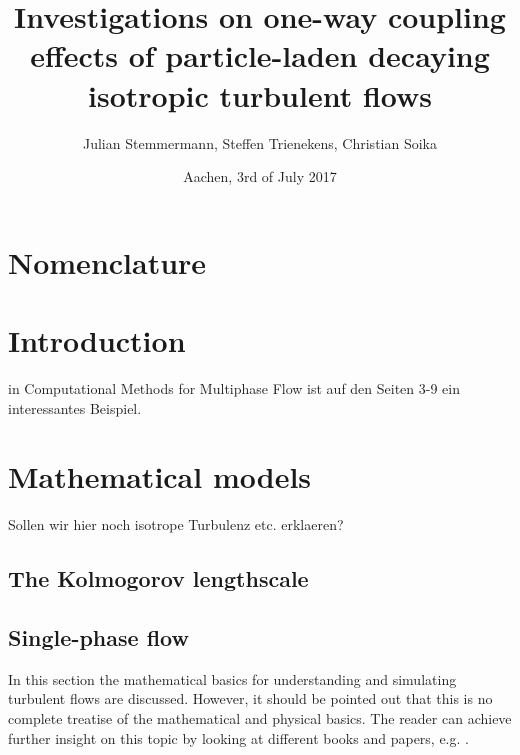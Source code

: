 \documentclass[a4paper,10pt]{article}
\title{Investigations on one-way coupling effects of particle-laden decaying isotropic turbulent flows}
\author{Julian Stemmermann, Steffen Trienekens, Christian Soika}
\date{Aachen, 3rd of July 2017}
\numberwithin{equation}{section} %
\begin{document}
\maketitle

\pagebreak

\tableofcontents{} %
 
\pagebreak

\section{Nomenclature}
\printnomenclature
\pagebreak

\section{Introduction}
in Computational Methods for Multiphase Flow ist auf den Seiten 3-9 ein interessantes Beispiel.
\pagebreak
\section{Mathematical models}
Sollen wir hier noch isotrope Turbulenz etc. erklaeren?
\subsection{The Kolmogorov lengthscale}
\subsection{Single-phase flow} %
In this section the mathematical basics for understanding and simulating turbulent flows are discussed. However, it should be pointed out that this is no
complete treatise of the mathematical and physical basics. The reader can achieve further insight on this topic by looking at different books and papers, 
e.g. \cite{turbulentFlows}.
\newline
\end{document}
